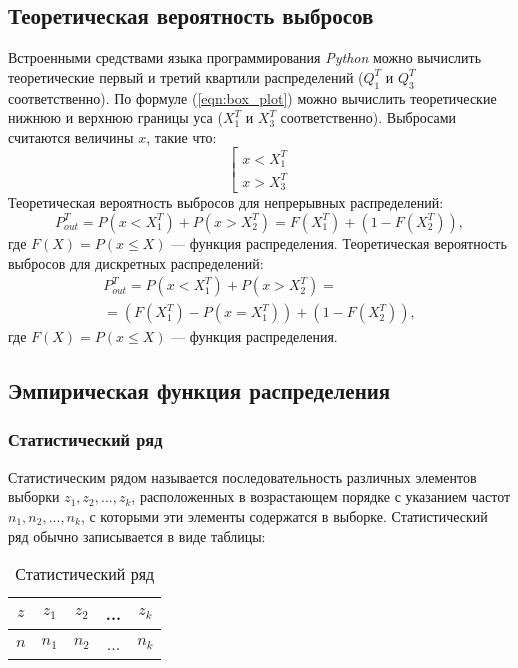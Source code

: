 \documentclass[12pt,a4paper]{article}
\begin{document}
	\subsection{Теоретическая вероятность выбросов}
		Встроенными средствами языка программирования \emph{Python} можно вычислить теоретические первый и третий квартили распределений ($Q^T_1$ и $Q^T_3$ соответственно). По формуле (\ref{eqn:box_plot}) можно вычислить теоретические нижнюю и верхнюю границы уса ($X^T_1$ и $X^T_3$ соответственно). Выбросами считаются величины $x$, такие что:
		\begin{equation}\label{eqn:outliers}
		\left[ \begin{array}{l}
		x < X^T_1 \\
		x > X^T_3
		\end{array} \right.
		\end{equation}
		Теоретическая вероятность выбросов для непрерывных распределений:
		\begin{equation}\label{eqn:continous_prob}
		P^T_{out} = P(x < X^T_1) + P(x > X^T_2) = F(X^T_1) + (1-F(X^T_2)),
		\end{equation}
		где $F(X) = P(x \leq X)$ --- функция распределения.
		Теоретическая вероятность выбросов для дискретных распределений:
		\begin{multline}\label{eqn:discrete_prob}
		P^T_{out} = P(x < X^T_1) + P(x > X^T_2)=\\
		= (F(X^T_1) - P(x = X^T_1)) + (1-F(X^T_2)),
		\end{multline}
		где $F(X) = P(x \leq X)$ --- функция распределения.
		
	\subsection{Эмпирическая функция распределения}
		\subsubsection{Статистический ряд}
			Статистическим рядом называется последовательность различных элементов выборки $z_1,z_2, ...,z_k$, расположенных в возрастающем порядке с указанием частот $n_1,n_2, ...,n_k$, с которыми эти элементы содержатся в выборке. Статистический ряд обычно записывается в виде таблицы:
			\begin{table}[h]
				\begin{center}
					\begin{tabular}{|c|c|c|c|c|}
						\hline
						$z$ & $z_1$ & $z_2$ & ... & $z_k$\\
						\hline
						$n$ & $n_1$ & $n_2$ & ... & $n_k$\\
						\hline
					\end{tabular}
				\end{center}
				\caption{Статистический ряд}
			\end{table}
		
\end{document}
